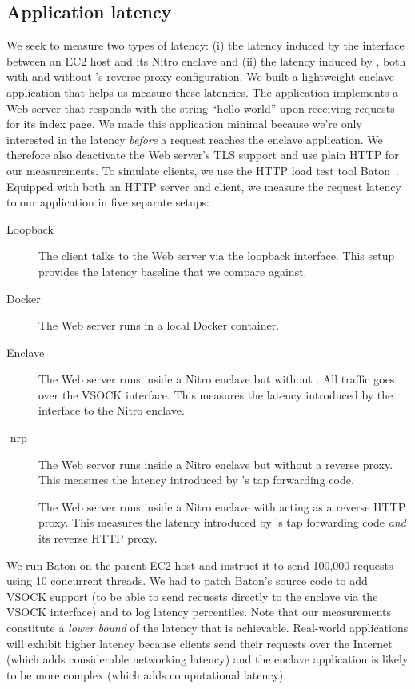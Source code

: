 \subsection{Application latency}%
\label{sec:latency}

We seek to measure two types of latency: (i) the latency induced by the
interface between an EC2 host and its Nitro enclave and (ii) the latency induced
by \tool{}, both with and without \tool{}'s reverse proxy configuration.  We
built a lightweight enclave application that helps us measure these latencies.
The application implements a Web server that responds with the string ``hello
world'' upon receiving requests for its index page.  We made this application
minimal because we're only interested in the latency \emph{before} a request
reaches the enclave application.  We therefore also deactivate the Web server's
TLS support and use plain HTTP for our measurements.  To simulate clients, we
use the HTTP load test tool Baton~\cite{baton}.  Equipped with both an HTTP
server and client, we measure the request latency to our application in five
separate setups:

\begin{description}
  \item[Loopback] The client talks to the Web server via the loopback interface.
    This setup provides the latency baseline that we compare against.

  \item[Docker] The Web server runs in a local Docker container.

  \item[Enclave] The Web server runs inside a Nitro enclave but without \tool{}.
    All traffic goes over the VSOCK interface.  This measures the latency
    introduced by the interface to the Nitro enclave.

  \item[\Tool{}-nrp] The Web server runs inside a Nitro enclave but without a
    reverse proxy.  This measures the latency introduced by \tool{}'s tap
    forwarding code.

  \item[\Tool{}] The Web server runs inside a Nitro enclave with \tool{} acting
    as a reverse HTTP proxy.  This measures the latency introduced by \tool{}'s
    tap forwarding code \emph{and} its reverse HTTP proxy.
\end{description}

We run Baton on the parent EC2 host and instruct it to send 100,000 requests
using 10 concurrent threads.  We had to patch Baton's source code to add VSOCK
support (to be able to send requests directly to the enclave via the VSOCK
interface) and to log latency percentiles.  Note that our measurements
constitute a \emph{lower bound} of the latency that is achievable.  Real-world
applications will exhibit higher latency because clients send their requests
over the Internet (which adds considerable networking latency) and the enclave
application is likely to be more complex (which adds computational latency).

